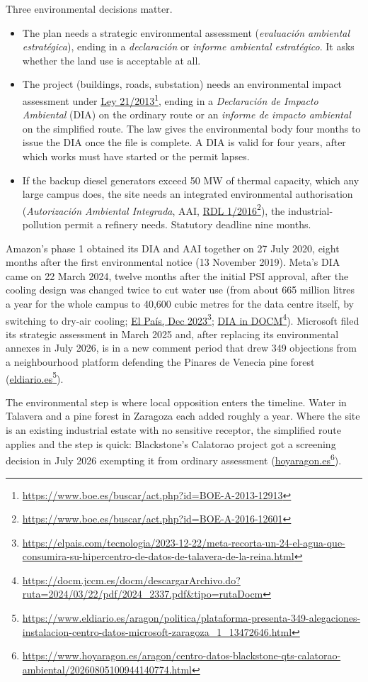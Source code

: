 \documentclass[11pt]{article}
\newcommand{\src}[2]{\href{#1}{#2}\footnote{\url{#1}}}
\begin{document}
Three environmental decisions matter.

\begin{itemize}[leftmargin=*]
\item The plan needs a strategic environmental assessment (\emph{evaluación ambiental estratégica}), ending in a \emph{declaración} or \emph{informe ambiental estratégico}. It asks whether the land use is acceptable at all.
\item The project (buildings, roads, substation) needs an environmental impact assessment under \src{https://www.boe.es/buscar/act.php?id=BOE-A-2013-12913}{Ley 21/2013}, ending in a \emph{Declaración de Impacto Ambiental} (DIA) on the ordinary route or an \emph{informe de impacto ambiental} on the simplified route. The law gives the environmental body four months to issue the DIA once the file is complete. A DIA is valid for four years, after which works must have started or the permit lapses.
\item If the backup diesel generators exceed 50 MW of thermal capacity, which any large campus does, the site needs an integrated environmental authorisation (\emph{Autorización Ambiental Integrada}, AAI, \src{https://www.boe.es/buscar/act.php?id=BOE-A-2016-12601}{RDL 1/2016}), the industrial-pollution permit a refinery needs. Statutory deadline nine months.
\end{itemize}

Amazon's phase 1 obtained its DIA and AAI together on 27 July 2020, eight months after the first environmental notice (13 November 2019). Meta's DIA came on 22 March 2024, twelve months after the initial PSI approval, after the cooling design was changed twice to cut water use (from about 665 million litres a year for the whole campus to 40,600 cubic metres for the data centre itself, by switching to dry-air cooling; \src{https://elpais.com/tecnologia/2023-12-22/meta-recorta-un-24-el-agua-que-consumira-su-hipercentro-de-datos-de-talavera-de-la-reina.html}{El País, Dec 2023}; \src{https://docm.jccm.es/docm/descargarArchivo.do?ruta=2024/03/22/pdf/2024_2337.pdf&tipo=rutaDocm}{DIA in DOCM}). Microsoft filed its strategic assessment in March 2025 and, after replacing its environmental annexes in July 2026, is in a new comment period that drew 349 objections from a neighbourhood platform defending the Pinares de Venecia pine forest (\src{https://www.eldiario.es/aragon/politica/plataforma-presenta-349-alegaciones-instalacion-centro-datos-microsoft-zaragoza_1_13472646.html}{eldiario.es}).

The environmental step is where local opposition enters the timeline. Water in Talavera and a pine forest in Zaragoza each added roughly a year. Where the site is an existing industrial estate with no sensitive receptor, the simplified route applies and the step is quick: Blackstone's Calatorao project got a screening decision in July 2026 exempting it from ordinary assessment (\src{https://www.hoyaragon.es/aragon/centro-datos-blackstone-qts-calatorao-ambiental/20260805100944140774.html}{hoyaragon.es}).
\end{document}
